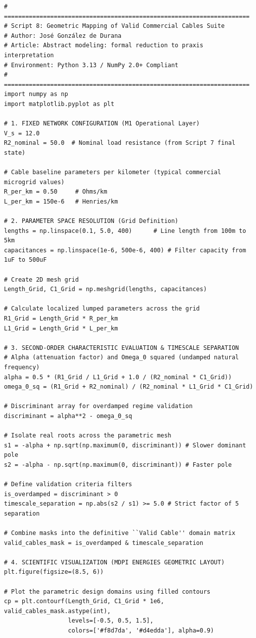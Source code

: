 \documentclass[energies,accept,oneauthor,pdftex]{Definitions/mdpi}
\begin{document}
{\footnotesize
\begin{verbatim}
# =====================================================================
# Script 8: Geometric Mapping of Valid Commercial Cables Suite
# Author: José González de Durana
# Article: Abstract modeling: formal reduction to praxis interpretation
# Environment: Python 3.13 / NumPy 2.0+ Compliant
# =====================================================================
import numpy as np
import matplotlib.pyplot as plt

# 1. FIXED NETWORK CONFIGURATION (M1 Operational Layer)
V_s = 12.0
R2_nominal = 50.0  # Nominal load resistance (from Script 7 final state)

# Cable baseline parameters per kilometer (typical commercial microgrid values)
R_per_km = 0.50     # Ohms/km
L_per_km = 150e-6   # Henries/km

# 2. PARAMETER SPACE RESOLUTION (Grid Definition)
lengths = np.linspace(0.1, 5.0, 400)      # Line length from 100m to 5km
capacitances = np.linspace(1e-6, 500e-6, 400) # Filter capacity from 1uF to 500uF

# Create 2D mesh grid
Length_Grid, C1_Grid = np.meshgrid(lengths, capacitances)

# Calculate localized lumped parameters across the grid
R1_Grid = Length_Grid * R_per_km
L1_Grid = Length_Grid * L_per_km

# 3. SECOND-ORDER CHARACTERISTIC EVALUATION & TIMESCALE SEPARATION
# Alpha (attenuation factor) and Omega_0 squared (undamped natural frequency)
alpha = 0.5 * (R1_Grid / L1_Grid + 1.0 / (R2_nominal * C1_Grid))
omega_0_sq = (R1_Grid + R2_nominal) / (R2_nominal * L1_Grid * C1_Grid)

# Discriminant array for overdamped regime validation
discriminant = alpha**2 - omega_0_sq

# Isolate real roots across the parametric mesh
s1 = -alpha + np.sqrt(np.maximum(0, discriminant)) # Slower dominant pole
s2 = -alpha - np.sqrt(np.maximum(0, discriminant)) # Faster pole

# Define validation criteria filters
is_overdamped = discriminant > 0
timescale_separation = np.abs(s2 / s1) >= 5.0 # Strict factor of 5 separation

# Combine masks into the definitive ``Valid Cable'' domain matrix
valid_cables_mask = is_overdamped & timescale_separation

# 4. SCIENTIFIC VISUALIZATION (MDPI ENERGIES GEOMETRIC LAYOUT)
plt.figure(figsize=(8.5, 6))

# Plot the parametric design domains using filled contours
cp = plt.contourf(Length_Grid, C1_Grid * 1e6, valid_cables_mask.astype(int),
                  levels=[-0.5, 0.5, 1.5],
                  colors=['#f8d7da', '#d4edda'], alpha=0.9)


\end{verbatim}}
\end{document}
